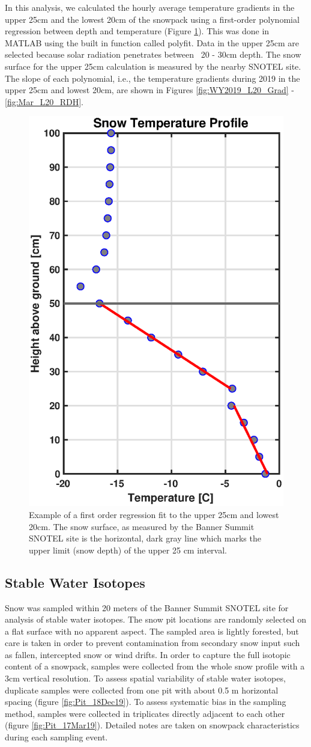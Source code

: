 In this analysis, we calculated the hourly average temperature gradients in the upper 25cm and the lowest 20cm of the snowpack using a first-order polynomial regression between depth and temperature (Figure \ref{fig:TempGrad_Ex}). This was done in MATLAB using the built in function called polyfit.  Data in the upper 25cm are selected because solar radiation penetrates between ~20 - 30cm depth. The snow surface for the upper 25cm calculation is measured by the nearby SNOTEL site. The slope of each polynomial, i.e., the temperature gradients during 2019 in the upper 25cm and lowest 20cm, are shown in Figures \ref{fig:WY2019_L20_Grad} - \ref{fig:Mar_L20_RDH}.  

\begin{figure}[H]
    \centering
    \includegraphics[width=0.5\linewidth]{figures/TempGrad/TempGrad_Ex.eps}
    \caption{Example of a first order regression fit to the upper 25cm and lowest 20cm. The snow surface, as measured by the Banner Summit SNOTEL site is the horizontal, dark gray line which marks the upper limit (snow depth) of the upper 25 cm interval.}
    \label{fig:TempGrad_Ex}
\end{figure}

\subsection{Stable Water Isotopes}
Snow was sampled within 20 meters of the Banner Summit SNOTEL site for analysis of stable water isotopes. The snow pit locations are randomly selected on a flat surface with no apparent aspect. The sampled area is lightly forested, but care is taken in order to prevent contamination from secondary snow input such as fallen, intercepted snow or wind drifts. In order to capture the full isotopic content of a snowpack, samples were collected from the whole snow profile with a 3cm vertical resolution. To assess spatial variability of stable water isotopes, duplicate samples were collected from one pit with about 0.5 m horizontal spacing (figure \ref{fig:Pit_18Dec19}). To assess systematic bias in the sampling method, samples were collected in triplicates directly adjacent to each other (figure \ref{fig:Pit_17Mar19}). Detailed notes are taken on snowpack characteristics during each sampling event.

